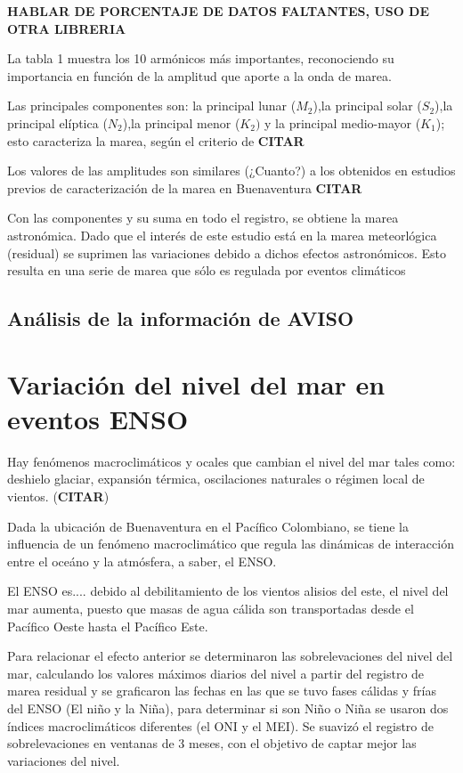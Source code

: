 \textbf{HABLAR DE PORCENTAJE DE DATOS FALTANTES, USO DE OTRA LIBRERIA}

La tabla 1 muestra los 10 armónicos más importantes, reconociendo su importancia en función de la amplitud que aporte a la onda de marea.

Las principales componentes son: la principal lunar ($M_{2}$),la principal solar ($S_{2}$),la principal elíptica ($N_{2}$),la principal menor ($K_{2})$ y la principal medio-mayor ($K_{1}$); esto caracteriza la marea, según el criterio de \textbf{CITAR} 

Los valores de las amplitudes son similares (¿Cuanto?) a los obtenidos en estudios previos de caracterización de la marea en Buenaventura \textbf{CITAR} 

Con las componentes y su suma en todo el registro, se obtiene la marea astronómica. Dado que el interés de este estudio está en la marea meteorlógica (residual) se suprimen las variaciones debido a dichos efectos astronómicos. Esto resulta en una serie de marea que sólo es regulada por eventos climáticos

\subsection{Análisis de la información de AVISO}

\section{Variación del nivel del mar en eventos ENSO}

Hay fenómenos macroclimáticos y ocales que cambian el nivel del mar tales como: deshielo glaciar, expansión térmica, oscilaciones naturales o régimen local de vientos. (\textbf{CITAR}) 

Dada la ubicación de Buenaventura en el Pacífico Colombiano, se tiene la influencia de un fenómeno macroclimático que regula las dinámicas de interacción entre el oceáno y la atmósfera, a saber, el ENSO.

El ENSO es.... debido al debilitamiento de los vientos alisios del este, el nivel del mar aumenta, puesto que masas de agua cálida son transportadas desde el Pacífico Oeste hasta el Pacífico Este.

Para relacionar el efecto anterior se determinaron las sobrelevaciones del nivel del mar, calculando los valores máximos diarios del nivel a partir del registro de marea residual y se graficaron las fechas en las que se tuvo fases cálidas y frías del ENSO (El niño y la Niña), para determinar si son Niño o Niña se usaron dos índices macroclimáticos diferentes (el ONI y el MEI). Se suavizó el registro de sobrelevaciones en ventanas de 3 meses, con el objetivo de captar mejor las variaciones del nivel.




